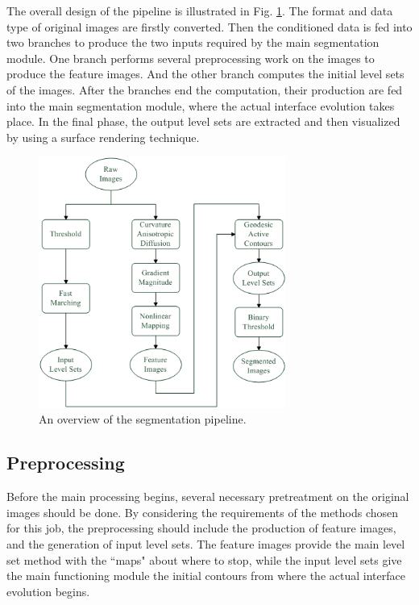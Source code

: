 The overall design of the pipeline is illustrated in Fig. \ref{fig:DataFlow}.
The format and data type of original images are firstly converted.
Then the conditioned data is fed into two branches to produce the two inputs required by the main segmentation module.
One branch performs several preprocessing work on the images to produce the feature images. %
And the other branch computes the initial level sets of the images. %
After the branches end the computation, their production are fed into the main segmentation module, where the actual interface evolution takes place.
In the final phase, the output level sets are extracted and then visualized by using a surface rendering technique.
\begin{figure}[tb]
\centering
\includegraphics[width=3.2in]{Figures/DataFlow.png}
\caption{An overview of the segmentation pipeline.}
\label{fig:DataFlow}
\end{figure}

\subsection{Preprocessing}

Before the main processing begins, several necessary pretreatment on the original images should be done.
By considering the requirements of the methods chosen for this job, the preprocessing should include the production of feature images, and the generation of input level sets.
The feature images provide the main level set method with the ``maps" about where to stop, while the input level sets give the main functioning module the initial contours from where the actual interface evolution begins.

